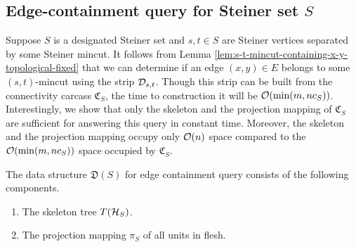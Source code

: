 \subsection{Edge-containment query for Steiner set \texorpdfstring{$S$}{S}} \label{subsec:edge-containment-ds-steiner}

Suppose $S$ is a designated Steiner set and $s,t\in S$ are Steiner vertices separated by some Steiner mincut. It follows from Lemma \ref{lem:s-t-mincut-containing-x-y-topological-fixed} that we can determine if an edge $(x,y)\in E$ belongs to some $(s,t)$-mincut using the strip ${\cal D}_{s,t}$. Though this strip can be built from the connectivity carcass
$\mathfrak{C}_S$, the time to construction it will be ${\cal O}(\min(m,nc_S))$. Interestingly, we show that only the skeleton and the projection mapping of $\mathfrak{C}_S$ are sufficient for answering this query in constant time. Moreover, the skeleton and the projection mapping occupy only ${\cal O}(n)$ space compared to the ${\cal O}(\min(m,nc_S))$ space occupied by $\mathfrak{C}_S$.

The data structure $\mathfrak{D}(S)$ for edge containment query consists of the following components.
\begin{enumerate}
\item The skeleton tree $T({\cal H}_S)$. 
\item The projection mapping ${\pi}_S$ of all units in flesh.
\end{enumerate}




